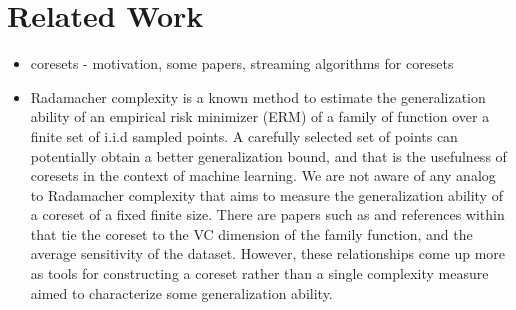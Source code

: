 \documentclass[anon,12pt]{colt2019} %
\newcommand{\zk}[1]{\textcolor{red}{ZK: #1}}
\begin{document}
\section{Related Work}
\begin{itemize}
\item coresets - motivation, some papers, streaming algorithms for coresets

\item Radamacher complexity \cite{Bartlett:2003:RGC:944919.944944} is a known method to estimate the generalization ability of an empirical risk minimizer (ERM) of a family of function over a finite set of i.i.d sampled points. A carefully selected set of points can potentially obtain a better generalization bound, and that is the usefulness of coresets in the context of machine learning. We are not aware of any analog to Radamacher complexity that aims to measure the generalization ability of a coreset of a fixed finite size. There are papers such as \cite{tolochinsky2018coresets} and references within that tie the coreset to the VC dimension of the family function, and the average sensitivity of the dataset. However, these relationships come up more as tools for constructing a coreset rather than a single complexity measure aimed to characterize some generalization ability.
%

%


\end{itemize}
\end{document}
